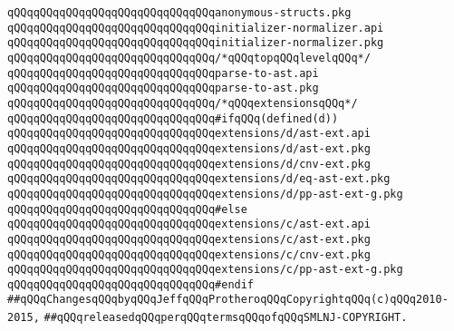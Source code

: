 \newline
\verb|qQQqqQQqqQQqqQQqqQQqqQQqqQQqqQQqanonymous-structs.pkg|\newline
\newline
\verb|qQQqqQQqqQQqqQQqqQQqqQQqqQQqqQQqinitializer-normalizer.api|\newline
\verb|qQQqqQQqqQQqqQQqqQQqqQQqqQQqqQQqinitializer-normalizer.pkg|\newline
\newline
\verb|qQQqqQQqqQQqqQQqqQQqqQQqqQQqqQQq/*qQQqtopqQQqlevelqQQq*/|\newline
\verb|qQQqqQQqqQQqqQQqqQQqqQQqqQQqqQQqparse-to-ast.api|\newline
\verb|qQQqqQQqqQQqqQQqqQQqqQQqqQQqqQQqparse-to-ast.pkg|\newline
\newline
\verb|qQQqqQQqqQQqqQQqqQQqqQQqqQQqqQQq/*qQQqextensionsqQQq*/|\newline
\verb|qQQqqQQqqQQqqQQqqQQqqQQqqQQqqQQq#ifqQQq(defined(d))|\newline
\verb|qQQqqQQqqQQqqQQqqQQqqQQqqQQqqQQqextensions/d/ast-ext.api|\newline
\verb|qQQqqQQqqQQqqQQqqQQqqQQqqQQqqQQqextensions/d/ast-ext.pkg|\newline
\verb|qQQqqQQqqQQqqQQqqQQqqQQqqQQqqQQqextensions/d/cnv-ext.pkg|\newline
\verb|qQQqqQQqqQQqqQQqqQQqqQQqqQQqqQQqextensions/d/eq-ast-ext.pkg|\newline
\verb|qQQqqQQqqQQqqQQqqQQqqQQqqQQqqQQqextensions/d/pp-ast-ext-g.pkg|\newline
\verb|qQQqqQQqqQQqqQQqqQQqqQQqqQQqqQQq#else|\newline
\verb|qQQqqQQqqQQqqQQqqQQqqQQqqQQqqQQqextensions/c/ast-ext.api|\newline
\verb|qQQqqQQqqQQqqQQqqQQqqQQqqQQqqQQqextensions/c/ast-ext.pkg|\newline
\verb|qQQqqQQqqQQqqQQqqQQqqQQqqQQqqQQqextensions/c/cnv-ext.pkg|\newline
\verb|qQQqqQQqqQQqqQQqqQQqqQQqqQQqqQQqextensions/c/pp-ast-ext-g.pkg|\newline
\verb|qQQqqQQqqQQqqQQqqQQqqQQqqQQqqQQq#endif|\newline
\newline
\newline
\verb|##qQQqChangesqQQqbyqQQqJeffqQQqProtheroqQQqCopyrightqQQq(c)qQQq2010-2015,|\newline
\verb|##qQQqreleasedqQQqperqQQqtermsqQQqofqQQqSMLNJ-COPYRIGHT.|\newline

